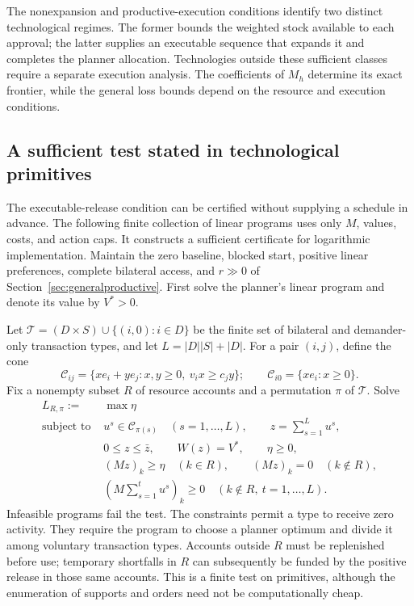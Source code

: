 \documentclass[ecta,draft]{econsocart}
\theoremstyle{definition}
\theoremstyle{definition}
\begin{document}
The nonexpansion and productive-execution conditions identify two distinct
technological regimes. The former bounds the weighted stock available to
each approval; the latter supplies an executable sequence that expands it
and completes the planner allocation. Technologies outside these sufficient
classes require a separate execution analysis. The coefficients of $M_h$
determine its exact frontier, while the general loss bounds depend on the
resource and execution conditions.

\subsection{A sufficient test stated in technological primitives}
\label{sec:primitiveproductivity}

The executable-release condition can be certified without supplying a
schedule in advance. The following finite collection of linear programs
uses only $M$, values, costs, and action caps. It constructs a sufficient certificate for logarithmic implementation. Maintain the
zero baseline, blocked start, positive linear preferences, complete
bilateral access, and $r\gg0$ of Section~\ref{sec:generalproductive}.
First solve the planner's linear program and denote its value by $V^*>0$.

Let $\mathcal T=(D\times S)\cup\{(i,0):i\in D\}$ be the finite set
of bilateral and demander-only transaction types, and let
$L=|D||S|+|D|$. For a pair $(i,j)$, define the cone
\[
 \mathcal C_{ij}
 =\{x e_i+y e_j:x,y\geq0,\ v_ix\geq c_jy\};
 \qquad \mathcal C_{i0}=\{x e_i:x\geq0\}.
\]
Fix a nonempty subset $R$ of resource accounts and a permutation
$\pi$ of $\mathcal T$. Solve
\[
 \begin{aligned}
 L_{R,\pi}:={}&\max \eta\\
 \text{subject to }&u^s\in\mathcal C_{\pi(s)}\quad(s=1,\ldots,L),
       \qquad z=\sum_{s=1}^L u^s,\\
 &0\leq z\leq\bar z,\qquad W(z)=V^*,\qquad\eta\geq0,\\
 &(Mz)_k\geq\eta\quad(k\in R),
       \qquad(Mz)_k=0\quad(k\notin R),\\
 &\left(M\sum_{s=1}^t u^s\right)_k\geq0
       \quad(k\notin R,\ t=1,\ldots,L).
 \end{aligned}
\]
Infeasible programs fail the test. The constraints permit a type to
receive zero activity. They require the program to choose a planner
optimum and divide it among voluntary transaction types. Accounts
outside $R$ must be replenished before use; temporary shortfalls in
$R$ can subsequently be funded by the positive release in those
same accounts. This is a finite test on primitives, although the
enumeration of supports and orders need not be computationally cheap.
\end{document}

